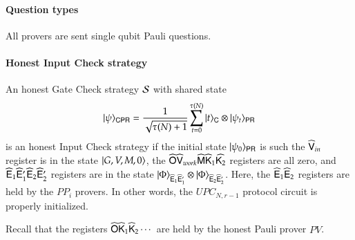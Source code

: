 

\paragraph{Question types} All provers are sent single qubit Pauli questions.

\paragraph{Honest Input Check strategy}
An honest Gate Check strategy $\mathcal{S}$ with shared state
\[
	|\psi\rangle_{{\mathsf{C}} {\mathsf{P}} {\mathsf{R}}} = \frac{1}{\sqrt{\tau(N) + 1}} \sum_{t = 0}^{\tau(N)} |t\rangle_{{\mathsf{C}}} \otimes |\psi_t\rangle_{{\mathsf{P}} {\mathsf{R}}}
\]
is an honest Input Check strategy if the initial state $|\psi_0\rangle_{{\mathsf{P}} {\mathsf{R}}}$ is such the
$\widehat{{\mathsf{V}}}_{in}$ register is in the state $|G,V,M,0\rangle$, the $\widehat{{\mathsf{O}}} \widehat{{\mathsf{V}}}_{work} \widehat{{\mathsf{M}}} \widehat{{\mathsf{K}}}_1 \widehat{{\mathsf{K}}_2}$ registers are all zero, and $\widehat{{\mathsf{E}}}_1 \widehat{{\mathsf{E}}}_1' \widehat{{\mathsf{E}}}_2 \widehat{{\mathsf{E}}}_2'$ registers are in the state $|\Phi\rangle_{\widehat{{\mathsf{E}}}_1 \widehat{{\mathsf{E}}}_1'} \otimes |\Phi\rangle_{\widehat{{\mathsf{E}}}_2 \widehat{{\mathsf{E}}}_2'}$. Here, the $\widehat{{\mathsf{E}}}_1 \widehat{{\mathsf{E}}}_2$ registers are held by the $PP_i$ provers. In other words, the $UPC_{N,r-1}$ protocol circuit is properly initialized.

Recall that the registers $\widehat{{\mathsf{O}}} \widehat{{\mathsf{K}}}_1 \widehat{{\mathsf{K}}}_2 \cdots$ are held by the honest Pauli prover $PV$.



